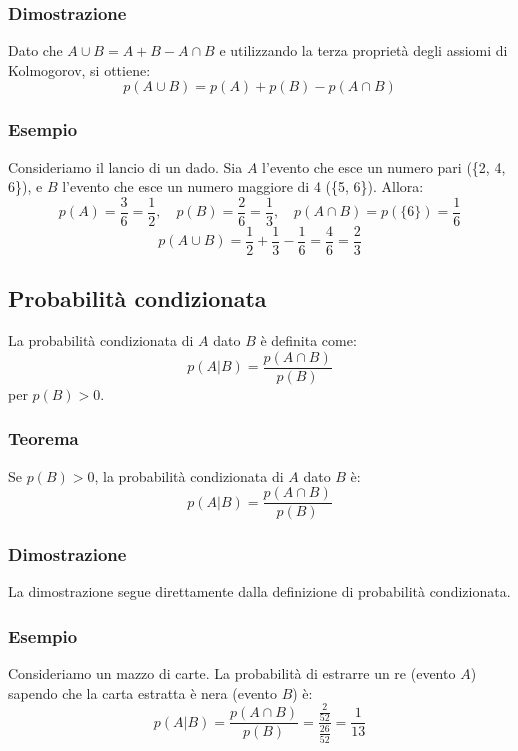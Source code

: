 \documentclass{article}
\begin{document}
\subsubsection{Dimostrazione}
Dato che \(A \cup B = A + B - A \cap B\) e utilizzando la terza proprietà degli assiomi di Kolmogorov, si ottiene:
\[
p(A \cup B) = p(A) + p(B) - p(A \cap B)
\]

\subsubsection{Esempio}
Consideriamo il lancio di un dado. Sia \(A\) l'evento che esce un numero pari (\{2, 4, 6\}), e \(B\) l'evento che esce un numero maggiore di 4 (\{5, 6\}). Allora:
\[
p(A) = \frac{3}{6} = \frac{1}{2}, \quad p(B) = \frac{2}{6} = \frac{1}{3}, \quad p(A \cap B) = p(\{6\}) = \frac{1}{6}
\]
\[
p(A \cup B) = \frac{1}{2} + \frac{1}{3} - \frac{1}{6} = \frac{4}{6} = \frac{2}{3}
\]


\newpage
\subsection{Probabilità condizionata}
La probabilità condizionata di \(A\) dato \(B\) è definita come:
\[
p(A | B) = \frac{p(A \cap B)}{p(B)}
\]
per \(p(B) > 0\).

\subsubsection{Teorema}
Se \(p(B) > 0\), la probabilità condizionata di \(A\) dato \(B\) è:
\[
p(A | B) = \frac{p(A \cap B)}{p(B)}
\]

\subsubsection{Dimostrazione}
La dimostrazione segue direttamente dalla definizione di probabilità condizionata.

\subsubsection{Esempio}
Consideriamo un mazzo di carte. La probabilità di estrarre un re (evento \(A\)) sapendo che la carta estratta è nera (evento \(B\)) è:
\[
p(A | B) = \frac{p(A \cap B)}{p(B)} = \frac{\frac{2}{52}}{\frac{26}{52}} = \frac{1}{13}
\]
\end{document}
